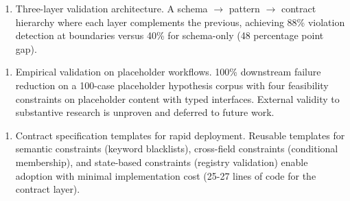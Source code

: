 \begin{enumerate}
\item Three-layer validation architecture. A schema $\rightarrow$ pattern $\rightarrow$ contract hierarchy where each layer complements the previous, achieving 88\% violation detection at boundaries versus 40\% for schema-only (48 percentage point gap).
\end{enumerate}

\begin{enumerate}
\item Empirical validation on placeholder workflows. 100\% downstream failure reduction on a 100-case placeholder hypothesis corpus with four feasibility constraints on placeholder content with typed interfaces. External validity to substantive research is unproven and deferred to future work.
\end{enumerate}

\begin{enumerate}
\item Contract specification templates for rapid deployment. Reusable templates for semantic constraints (keyword blacklists), cross-field constraints (conditional membership), and state-based constraints (registry validation) enable adoption with minimal implementation cost (25-27 lines of code for the contract layer).
\end{enumerate}
